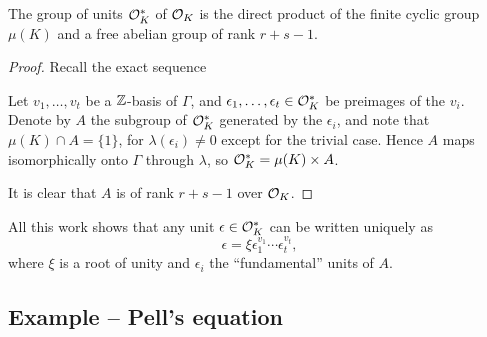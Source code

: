 \begin{thm}
	The group of units $\mathcal{O}^*_K$ of $\mathcal{O}_K$ is the direct product of the finite cyclic group $\mu(K)$ and a free abelian group of rank $r+s-1$.
\end{thm}
\begin{proof}
	Recall the exact sequence
	\begin{center}
	\end{center}
	Let $v_1,\dots,v_t$ be a $\mathbb{Z}$-basis of $\Gamma$, and $\epsilon_1,\dots,\epsilon_t\in\mathcal{O}^*_K$ be preimages of the $v_i$. Denote by $A$ the subgroup of $\mathcal{O}^*_K$ generated by the $\epsilon_i$, and note that $\mu(K)\cap A=\{1\}$, for $\lambda(\epsilon_i)\neq 0$ except for the trivial case. Hence $A$ maps isomorphically onto $\Gamma$ through $\lambda$, so $\mathcal{O}^*_K=\mu(K)\times A$.

	It is clear that $A$ is of rank $r+s-1$ over $\mathcal{O}_K$.

\end{proof}

All this work shows that any unit $\epsilon\in\mathcal{O}^*_K$ can be written uniquely as
\[
	\epsilon = \xi \epsilon_1^{v_1}\cdots\epsilon_t^{v_t},
\]
where $\xi$ is a root of unity and $\epsilon_i$ the ``fundamental'' units of $A$.


\subsection{Example -- Pell's equation}

